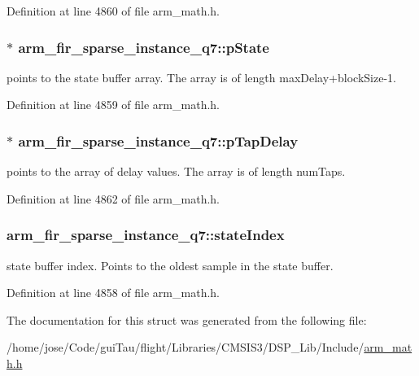 Definition at line 4860 of file arm\-\_\-math.\-h.

\hypertarget{structarm__fir__sparse__instance__q7_a18072cf3ef3666d588f0d49512f2b28f}{
\subsubsection[{p\-State}]{$\ast$ arm\-\_\-fir\-\_\-sparse\-\_\-instance\-\_\-q7\-::p\-State}}\label{structarm__fir__sparse__instance__q7_a18072cf3ef3666d588f0d49512f2b28f}
points to the state buffer array. The array is of length max\-Delay+block\-Size-\/1. 

Definition at line 4859 of file arm\-\_\-math.\-h.

\hypertarget{structarm__fir__sparse__instance__q7_ac625393c84bc0342ffdf26fc4eba1ac1}{
\subsubsection[{p\-Tap\-Delay}]{$\ast$ arm\-\_\-fir\-\_\-sparse\-\_\-instance\-\_\-q7\-::p\-Tap\-Delay}}\label{structarm__fir__sparse__instance__q7_ac625393c84bc0342ffdf26fc4eba1ac1}
points to the array of delay values. The array is of length num\-Taps. 

Definition at line 4862 of file arm\-\_\-math.\-h.

\hypertarget{structarm__fir__sparse__instance__q7_a2d2e65473fe3a3f2b953b4e0b60824df}{
\subsubsection[{state\-Index}]{ arm\-\_\-fir\-\_\-sparse\-\_\-instance\-\_\-q7\-::state\-Index}}\label{structarm__fir__sparse__instance__q7_a2d2e65473fe3a3f2b953b4e0b60824df}
state buffer index. Points to the oldest sample in the state buffer. 

Definition at line 4858 of file arm\-\_\-math.\-h.



The documentation for this struct was generated from the following file\-:\begin{DoxyCompactItemize}
\item 
/home/jose/\-Code/gui\-Tau/flight/\-Libraries/\-C\-M\-S\-I\-S3/\-D\-S\-P\-\_\-\-Lib/\-Include/\hyperlink{arm__math_8h}{arm\-\_\-math.\-h}\end{DoxyCompactItemize}
